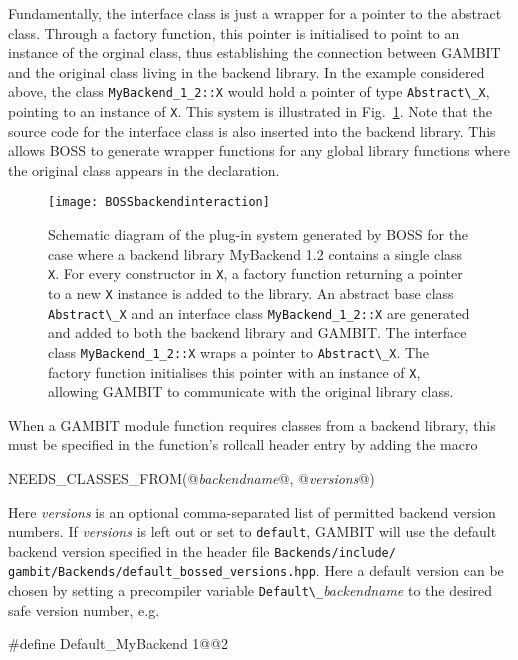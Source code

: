 \documentclass[pdftex,twocolumn,epjc3_preprint,runningheads]{svjour3}
\renewcommand{\_}{\discretionary{\underscore}{}{\underscore}}
\newcommand\cpp[1]{{\lstinline!#1!}}  %
\newcommand\term[1]{{\lstset{style=terminal}\lstinline!#1!\lstset{style=cpp}}}
\newcommand{\metavarf}[1]{\textit{\color{darkgreen}\footnotesize\textrm{#1}}}
\newcommand{\metavar}{\metavarf}
\newcommand{\gambit}{\textsf{GAMBIT}\xspace}
\newcommand{\BOSS}{\textsf{BOSS}\xspace}
\newcommand{\GB}{\gambit}
\begin{document}
Fundamentally, the interface class is just a wrapper for a pointer to the abstract class. Through a factory function, this pointer is initialised to point to an instance of the orginal class, thus establishing the connection between \GB and the original class living in the backend library. In the example considered above, the class \cpp{MyBackend_1_2::X} would hold a pointer of type \mbox{\cpp{Abstract\_X},} pointing to an instance of \cpp{X}. This system is illustrated in Fig.\ \ref{fig::boss}. Note that the source code for the interface class is also inserted into the backend library. This allows \BOSS to generate wrapper functions for any global library functions where the original class appears in the declaration.

\begin{figure}
\centering
\texttt{[image: BOSS\_backend\_interaction]}
\caption{Schematic diagram of the plug-in system generated by \BOSS for the case where a backend library \textsf{MyBackend 1.2} contains a single class \cpp{X}. For every constructor in \cpp{X}, a factory function returning a pointer to a new \cpp{X} instance is added to the library. An abstract base class \cpp{Abstract\_X} and an interface class \cpp{MyBackend_1_2::X} are generated and added to both the backend library and \GB. The interface class \cpp{MyBackend_1_2::X} wraps a pointer to \cpp{Abstract\_X}. The factory function initialises this pointer with an instance of \cpp{X}, allowing \GB to communicate with the original library class.}
\label{fig::boss}
\end{figure}

When a \GB module function requires classes from a backend library, this must be specified in the function's rollcall header entry by adding the macro
\begin{lstcpp}
NEEDS_CLASSES_FROM(@\metavar{backend\_name}@, @\metavar{versions}@)
\end{lstcpp}
Here \metavar{versions} is an optional comma-separated list of permitted backend version numbers. If \metavar{versions} is left out or set to \mbox{\cpp{default},} \GB will use the default backend version specified in the header file \term{Backends/include/} \mbox{\term{gambit/Backends/default_bossed_versions.hpp}}. Here a default version can be chosen by setting a precompiler variable \cpp{Default\_}\metavar{backend\_name} to the desired safe version number, e.g.\
\begin{lstcpp}
#define Default_MyBackend 1@\_@2
\end{lstcpp}
\end{document}
